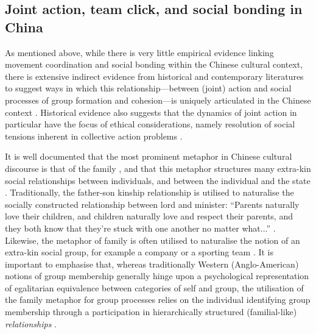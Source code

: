 

\subsection{Joint action, team click, and social bonding in China}
As mentioned above, while there is very little empirical evidence linking movement coordination and social bonding within the Chinese cultural context, there is extensive indirect evidence from historical and contemporary literatures to suggest ways in which this relationship---between (joint) action and social processes of group formation and cohesion---is uniquely articulated in the Chinese context \citep{Weed2011}.  Historical evidence also suggests that the dynamics of joint action in particular have the focus of ethical considerations, namely resolution of social tensions inherent in collective action problems \citep{Slingerland2014}.

It is well documented that the most prominent metaphor in Chinese cultural discourse is that of the family \citep{Maehr1980}, and that this metaphor structures many extra-kin social relationships between individuals, and between the individual and the state \citep{Gold2002}.  Traditionally, the father-son kinship relationship is utilised to naturalise the socially constructed relationship between lord and minister: ``Parents naturally love their children, and children naturally love and respect their parents, and they both know that they're stuck with one another no matter what...'' \citep[178]{Slingerland2014}. Likewise, the metaphor of family is often utilised to naturalise the notion of an extra-kin social group, for example a company or a sporting team \citep{Brownell2008}.
It is important to emphasise that, whereas traditionally Western (Anglo-American) notions of group membership generally hinge upon a psychological representation of egalitarian equivalence between categories of self and group, the utilisation of the family metaphor for group processes relies on the individual identifying group membership through a participation in hierarchically structured (familial-like) \textit{relationships} \citep{Fei1992}.


